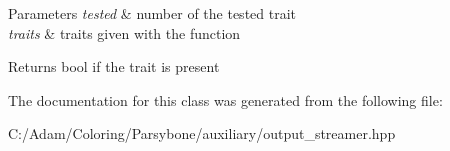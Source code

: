 \begin{DoxyParams}{Parameters}
{\em tested} & number of the tested trait \\
\hline
{\em traits} & traits given with the function\\
\hline
\end{DoxyParams}
\begin{DoxyReturn}{Returns}
bool if the trait is present 
\end{DoxyReturn}


The documentation for this class was generated from the following file\-:\begin{DoxyCompactItemize}
\item 
C\-:/\-Adam/\-Coloring/\-Parsybone/auxiliary/output\-\_\-streamer.\-hpp\end{DoxyCompactItemize}
